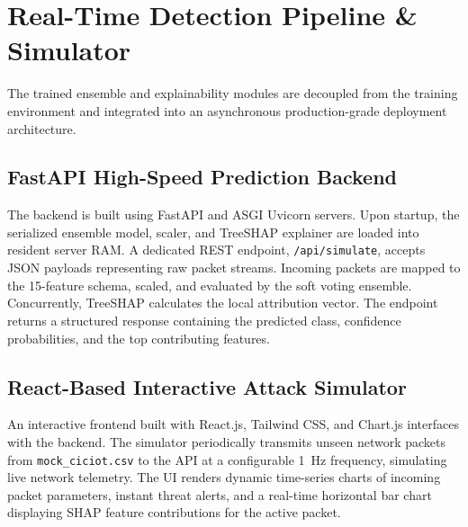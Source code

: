 \documentclass[conference]{IEEEtran}
\begin{document}
\section{Real-Time Detection Pipeline \& Simulator}
The trained ensemble and explainability modules are decoupled from the training environment and integrated into an asynchronous production-grade deployment architecture.

\subsection{FastAPI High-Speed Prediction Backend}
The backend is built using FastAPI and ASGI Uvicorn servers. Upon startup, the serialized ensemble model, scaler, and TreeSHAP explainer are loaded into resident server RAM. A dedicated REST endpoint, \texttt{/api/simulate}, accepts JSON payloads representing raw packet streams. Incoming packets are mapped to the 15-feature schema, scaled, and evaluated by the soft voting ensemble. Concurrently, TreeSHAP calculates the local attribution vector. The endpoint returns a structured response containing the predicted class, confidence probabilities, and the top contributing features.

\subsection{React-Based Interactive Attack Simulator}
An interactive frontend built with React.js, Tailwind CSS, and Chart.js interfaces with the backend. The simulator periodically transmits unseen network packets from \texttt{mock\_ciciot.csv} to the API at a configurable 1~Hz frequency, simulating live network telemetry. The UI renders dynamic time-series charts of incoming packet parameters, instant threat alerts, and a real-time horizontal bar chart displaying SHAP feature contributions for the active packet.
\end{document}
